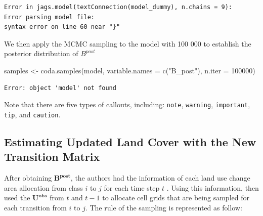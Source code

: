 \documentclass[
  letterpaper,
  DIV=11,
  numbers=noendperiod]{scrartcl}
\newenvironment{Shaded}{\begin{snugshade}}{\end{snugshade}}
\newcommand{\AttributeTok}[1]{\textcolor[rgb]{0.40,0.45,0.13}{#1}}
\newcommand{\DecValTok}[1]{\textcolor[rgb]{0.68,0.00,0.00}{#1}}
\newcommand{\FunctionTok}[1]{\textcolor[rgb]{0.28,0.35,0.67}{#1}}
\newcommand{\NormalTok}[1]{\textcolor[rgb]{0.00,0.23,0.31}{#1}}
\newcommand{\OtherTok}[1]{\textcolor[rgb]{0.00,0.23,0.31}{#1}}
\newcommand{\StringTok}[1]{\textcolor[rgb]{0.13,0.47,0.30}{#1}}
\begin{document}
\begin{verbatim}
Error in jags.model(textConnection(model_dummy), n.chains = 9): 
Error parsing model file:
syntax error on line 60 near "}"
\end{verbatim}

We then apply the MCMC sampling to the model with 100 000 to establish
the posterior distribution of \(B^{post}\)

\begin{Shaded}
\begin{Highlighting}[]
\NormalTok{samples }\OtherTok{\textless{}{-}} \FunctionTok{coda.samples}\NormalTok{(model, }
                        \AttributeTok{variable.names =} \FunctionTok{c}\NormalTok{(}\StringTok{"B\_post"}\NormalTok{), }
                        \AttributeTok{n.iter =} \DecValTok{100000}\NormalTok{)}
\end{Highlighting}
\end{Shaded}

\begin{verbatim}
Error: object 'model' not found
\end{verbatim}

\begin{tcolorbox}[enhanced jigsaw, toprule=.15mm, arc=.35mm, bottomtitle=1mm, colframe=quarto-callout-note-color-frame, coltitle=black, rightrule=.15mm, leftrule=.75mm, titlerule=0mm, opacitybacktitle=0.6, bottomrule=.15mm, colback=white, toptitle=1mm, title=\textcolor{quarto-callout-note-color}{\faInfo}\hspace{0.5em}{Why did the author chose this parameters to run the MCMC?}, breakable, left=2mm, opacityback=0, colbacktitle=quarto-callout-note-color!10!white]

Note that there are five types of callouts, including: \texttt{note},
\texttt{warning}, \texttt{important}, \texttt{tip}, and
\texttt{caution}.

\end{tcolorbox}

\hypertarget{estimating-updated-land-cover-with-the-new-transition-matrix}{%
\subsection{Estimating Updated Land Cover with the New Transition
Matrix}\label{estimating-updated-land-cover-with-the-new-transition-matrix}}

After obtaining \(\mathbf{B^{post}}\), the authors had the information
of each land use change area allocation from class \(i\) to \(j\) for
each time step \(t\) . Using this information, then used the
\(\mathbf{U^{obs}}\) from \(t\) and \(t-1\) to allocate cell grids that
are being sampled for each transition from \(i\) to \(j\). The rule of
the sampling is represented as follow:
\end{document}
